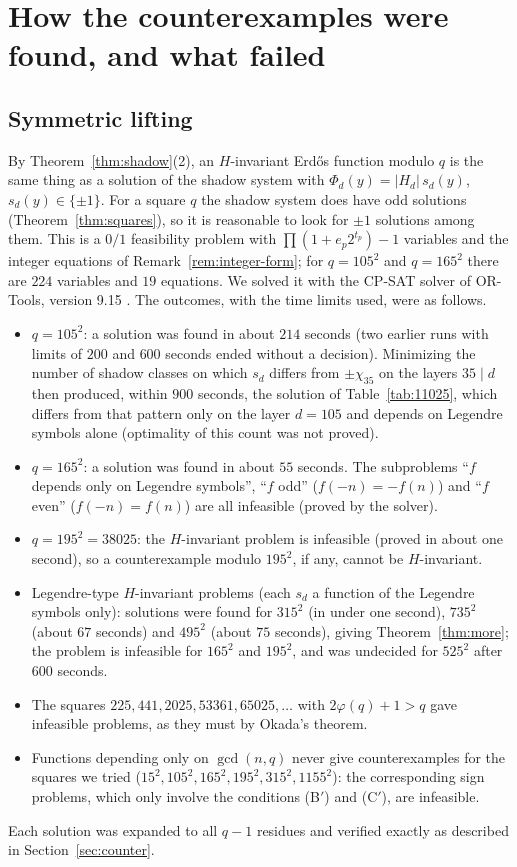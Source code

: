 \documentclass[11pt]{amsart}
\theoremstyle{definition}
\theoremstyle{remark}
\numberwithin{equation}{section}
\begin{document}
\section{How the counterexamples were found, and what failed}\label{sec:found}

\subsection{Symmetric lifting}
By Theorem~\ref{thm:shadow}(2), an $H$-invariant Erd\H{o}s function modulo $q$ is the same thing as a solution of the shadow system with $\Phi_d(y)=|H_d|\,s_d(y)$, $s_d(y)\in\{\pm1\}$.
For a square $q$ the shadow system does have odd solutions (Theorem~\ref{thm:squares}), so it is reasonable to look for $\pm1$ solutions among them.
This is a $0/1$ feasibility problem with $\prod(1+e_p2^{t_p})-1$ variables and the integer equations of Remark~\ref{rem:integer-form}; for $q=105^2$ and $q=165^2$ there are $224$ variables and $19$ equations.
We solved it with the CP-SAT solver of OR-Tools, version 9.15 \cite{ORT}.
The outcomes, with the time limits used, were as follows.
\begin{itemize}
\item $q=105^2$: a solution was found in about $214$ seconds (two earlier runs with limits of $200$ and $600$ seconds ended without a decision).
Minimizing the number of shadow classes on which $s_d$ differs from $\pm\chi_{35}$ on the layers $35\mid d$ then produced, within $900$ seconds, the solution of Table~\ref{tab:11025}, which differs from that pattern only on the layer $d=105$ and depends on Legendre symbols alone (optimality of this count was not proved).
\item $q=165^2$: a solution was found in about $55$ seconds.
The subproblems ``$f$ depends only on Legendre symbols'', ``$f$ odd'' ($f(-n)=-f(n)$) and ``$f$ even'' ($f(-n)=f(n)$) are all infeasible (proved by the solver).
\item $q=195^2=38025$: the $H$-invariant problem is infeasible (proved in about one second), so a counterexample modulo $195^2$, if any, cannot be $H$-invariant.
\item Legendre-type $H$-invariant problems (each $s_d$ a function of the Legendre symbols only): solutions were found for $315^2$ (in under one second), $735^2$ (about $67$ seconds) and $495^2$ (about $75$ seconds), giving Theorem~\ref{thm:more}; the problem is infeasible for $165^2$ and $195^2$, and was undecided for $525^2$ after $600$ seconds.
\item The squares $225, 441, 2025, 53361, 65025,\dots$ with $2\varphi(q)+1>q$ gave infeasible problems, as they must by Okada's theorem.
\item Functions depending only on $\gcd(n,q)$ never give counterexamples for the squares we tried ($15^2,105^2,165^2,195^2,315^2,1155^2$): the corresponding sign problems, which only involve the conditions (B$'$) and (C$'$), are infeasible.
\end{itemize}
Each solution was expanded to all $q-1$ residues and verified exactly as described in Section~\ref{sec:counter}.
\end{document}
